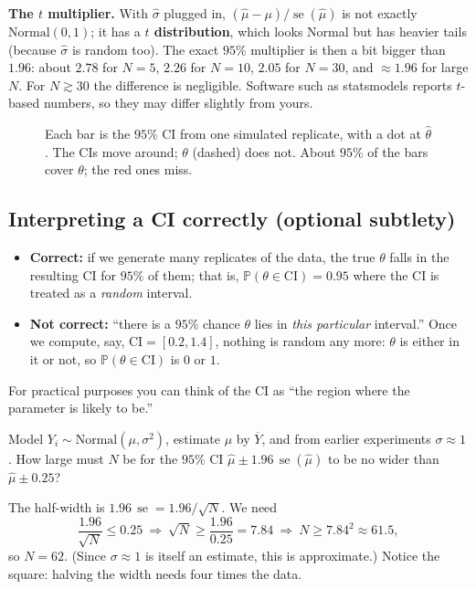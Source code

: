 \documentclass[11pt]{article}
\newcommand{\se}{\operatorname{se}}
\renewcommand{\P}{\mathbb{P}}
\newcommand{\Norm}{\text{Normal}}
\newcommand{\Ybar}{\overline{Y}}
\begin{document}
\textbf{The $t$ multiplier.} With $\hat\sigma$ plugged in, $(\hat\mu-\mu)/\se(\hat\mu)$ is not exactly $\Norm(0,1)$; it has a
\textbf{$t$ distribution}, which looks Normal but has heavier tails (because $\hat\sigma$ is random too). The exact $95\%$ multiplier is
then a bit bigger than $1.96$: about $2.78$ for $N=5$, $2.26$ for $N=10$, $2.05$ for $N=30$, and $\approx1.96$ for large $N$. For
$N\gtrsim30$ the difference is negligible. Software such as statsmodels reports $t$-based numbers, so they may differ slightly from yours.

\begin{figure}[h]
\centering
{}
\caption{Each bar is the $95\%$ CI from one simulated replicate, with a dot at $\hat\theta$. The CIs move around; $\theta$ (dashed) does not.
About $95\%$ of the bars cover $\theta$; the red ones miss.}
\end{figure}

\subsection{Interpreting a CI correctly (optional subtlety)}
\begin{itemize}[leftmargin=*,itemsep=2pt]
\item \textbf{Correct:} if we generate many replicates of the data, the true $\theta$ falls in the resulting CI for $95\%$ of them; that is,
$\P(\theta\in\text{CI})=0.95$ where the CI is treated as a \emph{random} interval.
\item \textbf{Not correct:} ``there is a $95\%$ chance $\theta$ lies in \emph{this particular} interval.'' Once we compute, say,
$\text{CI}=[0.2,1.4]$, nothing is random any more: $\theta$ is either in it or not, so $\P(\theta\in\text{CI})$ is $0$ or $1$.
\end{itemize}
For practical purposes you can think of the CI as ``the region where the parameter is likely to be.''

\begin{examplebox}[title={Example (notes): how much data for a target CI width?}]
Model $Y_i\sim\Norm(\mu,\sigma^2)$, estimate $\mu$ by $\Ybar$, and from earlier experiments $\sigma\approx1$. How large must $N$ be for the
$95\%$ CI $\hat\mu\pm1.96\,\se(\hat\mu)$ to be no wider than $\hat\mu\pm0.25$?

The half-width is $1.96\,\se=1.96/\sqrt N$. We need
\[
\frac{1.96}{\sqrt N}\le0.25\ \Longrightarrow\ \sqrt N\ge\frac{1.96}{0.25}=7.84\ \Longrightarrow\ N\ge7.84^2\approx61.5,
\]
so $N=62$. (Since $\sigma\approx1$ is itself an estimate, this is approximate.) Notice the square: halving the width needs four times
the data.
\end{examplebox}
\end{document}
